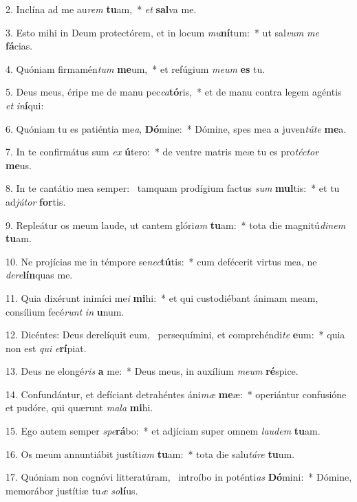 2. Inclína ad me au\textit{rem} \textbf{tu}am,~*  \textit{et} \textbf{sal}va me.\

3. Esto mihi in Deum protectórem, et in locum \textit{mu}\textbf{ní}tum:~*  ut sal\textit{vum} \textit{me} \textbf{fá}cias.\

4. Quóniam firmamén\textit{tum} \textbf{me}um,~*  et refúgium \textit{me}\textit{um} \textbf{es} tu.\

5. Deus meus, éripe me de manu pec\textit{ca}\textbf{tó}ris,~*  et de manu contra legem agéntis \textit{et} \textit{in}\textbf{í}qui:\

6. Quóniam tu es patiéntia me\textit{a}, \textbf{Dó}mine:~*  Dómine, spes mea a juven\textit{tú}\textit{te} \textbf{me}a.\

7. In te confirmátus sum \textit{ex} \textbf{ú}tero:~*  de ventre matris meæ tu es pro\textit{téc}\textit{tor} \textbf{me}us.\

8. In te cantátio mea semper: \dag\  tamquam prodígium factus \textit{sum} \textbf{mul}tis:~*  et tu ad\textit{jú}\textit{tor} \textbf{for}tis.\

9. Repleátur os meum laude, ut cantem glóri\textit{am} \textbf{tu}am:~*  tota die magnitú\textit{di}\textit{nem} \textbf{tu}am.\

10. Ne projícias me in témpore se\textit{nec}\textbf{tú}tis:~*  cum defécerit virtus mea, ne \textit{de}\textit{re}\textbf{lín}quas me.\

11. Quia dixérunt inimíci me\textit{i} \textbf{mi}hi:~*  et qui custodiébant ánimam meam, consílium fecé\textit{runt} \textit{in} \textbf{u}num.\

12. Dicéntes: Deus derelíquit eum, \dag\  persequímini, et comprehéndi\textit{te} \textbf{e}um:~*  quia non est \textit{qui} \textit{e}\textbf{rí}piat.\

13. Deus ne elongé\textit{ris} \textbf{a} me:~*  Deus meus, in auxílium \textit{me}\textit{um} \textbf{ré}spice.\

14. Confundántur, et defíciant detrahéntes áni\textit{mæ} \textbf{me}æ:~*  operiántur confusióne et pudóre, qui quærunt \textit{ma}\textit{la} \textbf{mi}hi.\

15. Ego autem semper \textit{spe}\textbf{rá}bo:~*  et adjíciam super omnem \textit{lau}\textit{dem} \textbf{tu}am.\

16. Os meum annuntiábit justíti\textit{am} \textbf{tu}am:~*  tota die salu\textit{tá}\textit{re} \textbf{tu}um.\

17. Quóniam non cognóvi litteratúram, \dag\  introíbo in poténti\textit{as} \textbf{Dó}mini:~*  Dómine, memorábor justítiæ tu\textit{æ} \textit{so}\textbf{lí}us.\

